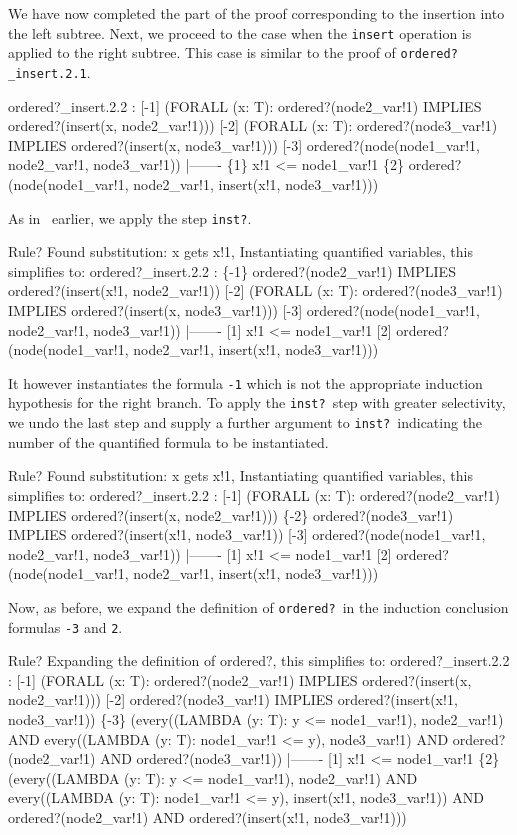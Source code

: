 \documentclass[11pt,twoside]{book}
\newcommand{\pvsref}[1]{\fbox{\footnotesize\ref{#1}}} \def\id#1{\hbox{\textt{#1}}} %
\begin{document}
We have now completed the part of the proof corresponding to the
insertion into the left subtree.   
Next, we proceed to the case when the \texttt{insert} operation is applied
to the right subtree.  This case is similar to the proof of
\texttt{ordered?\_insert.2.1}\@.  
\begin{session*}
ordered?_insert.2.2 :  
[-1]   (FORALL (x: T):
         ordered?(node2_var!1) IMPLIES ordered?(insert(x, node2_var!1)))
[-2]   (FORALL (x: T):
         ordered?(node3_var!1) IMPLIES ordered?(insert(x, node3_var!1)))
[-3]   ordered?(node(node1_var!1, node2_var!1, node3_var!1))
  |-------
\{1\}   x!1 <= node1_var!1
\{2\}   ordered?(node(node1_var!1, node2_var!1, insert(x!1, node3_var!1)))
\end{session*}
As in~\pvsref{ordered?_insert.2.1} earlier, we apply the step \texttt{inst?}\@.
\begin{session*}
Rule? 
Found substitution:
x gets x!1,
Instantiating quantified variables,
this simplifies to: 
ordered?_insert.2.2 :  
\{-1\}   ordered?(node2_var!1) IMPLIES ordered?(insert(x!1, node2_var!1))
[-2]   (FORALL (x: T):
         ordered?(node3_var!1) IMPLIES ordered?(insert(x, node3_var!1)))
[-3]   ordered?(node(node1_var!1, node2_var!1, node3_var!1))
  |-------
[1]   x!1 <= node1_var!1
[2]   ordered?(node(node1_var!1, node2_var!1, insert(x!1, node3_var!1)))
\end{session*}
It however  instantiates the formula \texttt{-1} which is not
the appropriate induction hypothesis for the right branch.  To
apply the \texttt{inst?}\ step with greater selectivity, we undo the
last step and supply
a further argument to \texttt{inst?}\ indicating the number of the quantified
formula to be instantiated.
\begin{session*}
Rule? 
Found substitution:
x gets x!1,
Instantiating quantified variables,
this simplifies to: 
ordered?_insert.2.2 :  
[-1]   (FORALL (x: T):
         ordered?(node2_var!1) IMPLIES ordered?(insert(x, node2_var!1)))
\{-2\}   ordered?(node3_var!1) IMPLIES ordered?(insert(x!1, node3_var!1))
[-3]   ordered?(node(node1_var!1, node2_var!1, node3_var!1))
  |-------
[1]   x!1 <= node1_var!1
[2]   ordered?(node(node1_var!1, node2_var!1, insert(x!1, node3_var!1)))
\end{session*}
Now, as before, we expand the definition of \texttt{ordered?}\ in the
induction conclusion formulas \texttt{-3} and \texttt{2}\@.
\begin{session*}
Rule? 
Expanding the definition of ordered?,
this simplifies to: 
ordered?_insert.2.2 :  
[-1]   (FORALL (x: T):
         ordered?(node2_var!1) IMPLIES ordered?(insert(x, node2_var!1)))
[-2]   ordered?(node3_var!1) IMPLIES ordered?(insert(x!1, node3_var!1))
\{-3\}   (every((LAMBDA (y: T): y <= node1_var!1), node2_var!1)
           AND every((LAMBDA (y: T): node1_var!1 <= y), node3_var!1)
             AND ordered?(node2_var!1) AND ordered?(node3_var!1))
  |-------
[1]   x!1 <= node1_var!1
\{2\}   (every((LAMBDA (y: T): y <= node1_var!1), node2_var!1)
           AND
         every((LAMBDA (y: T): node1_var!1 <= y), insert(x!1, node3_var!1))
             AND ordered?(node2_var!1) AND ordered?(insert(x!1, node3_var!1)))
\end{session*}
\end{document}
